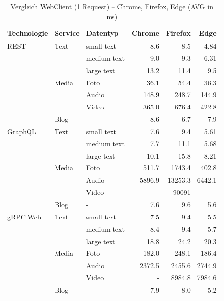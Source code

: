 	\begin{table}[h]
		\centering
		\caption{Vergleich WebClient (1 Request) – Chrome, Firefox, Edge (AVG in ms)}
		\label{tab:browser-comparison-1req}
		\renewcommand{\arraystretch}{1.2}
		\begin{tabular}{|l|l|l|r|r|r|}
			\hline
			\textbf{Technologie} & \textbf{Service} & \textbf{Datentyp} & \textbf{Chrome} & \textbf{Firefox} & \textbf{Edge} \\
			\hline
			REST & Text  & small text  & 8.6   & 8.5   & 4.84 \\
			&       & medium text & 9.0   & 9.3   & 6.31 \\
			&       & large text  & 13.2  & 11.4  & 9.5  \\
			& Media & Foto        & 36.1  & 54.4  & 36.3 \\
			&       & Audio       & 148.9 & 248.7 & 144.9 \\
			&       & Video       & 365.0 & 676.4 & 422.8 \\
			& Blog  & -           & 8.6   & 6.7   & 7.9  \\
			\hline
			GraphQL & Text  & small text  & 7.6   & 9.4   & 5.61 \\
			&       & medium text & 7.7   & 11.1  & 5.68 \\
			&       & large text  & 10.1  & 15.8  & 8.21 \\
			& Media & Foto        & 511.7 & 1743.4 & 402.8 \\
			&       & Audio       & 5896.9 & 13253.3 & 6442.1 \\
			&       & Video       & -     & 90091  & - \\
			& Blog  & -           & 7.6   & 9.6   & 5.6 \\
			\hline
			gRPC-Web & Text  & small text  & 7.5   & 9.4   & 5.5 \\
			&       & medium text & 8.4   & 9.4   & 5.7 \\
			&       & large text  & 18.8  & 24.2  & 20.3 \\
			& Media & Foto        & 182.0 & 248.1 & 186.4 \\
			&       & Audio       & 2372.5 & 2455.6 & 2744.9 \\
			&       & Video       & -     & 8984.8 & 7984.6 \\
			& Blog  & -           & 7.9   & 8.0   & 5.2 \\
			\hline
		\end{tabular}
	\end{table}

